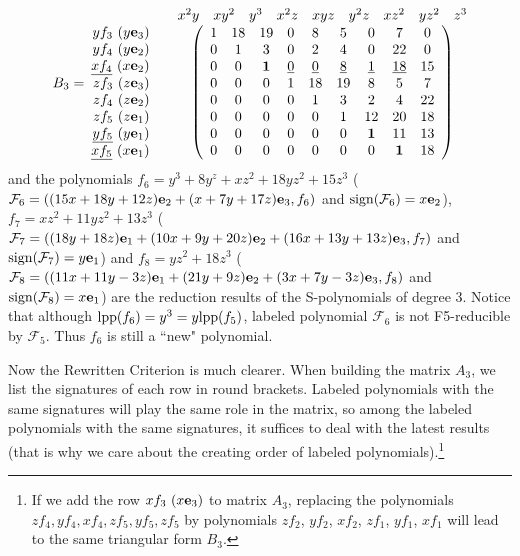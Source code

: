 \documentclass[preprint,authoryear,3p,12pt]{elsarticle}
\def\lpp{{\rm lpp}}
\def\eb{{\bf e}}
\def\s{{\rm{sign}}}
\begin{document}
\[
\begin{array}{cc} & \begin{array}{cccccccccc}
x^2y & xy^2 & y^3 & x^2z & xyz & y^2z & xz^2 & yz^2 & z^3
\end{array}\\
\begin{array}{r}
yf_3\ (y\eb_3)\\ yf_4\ (y\eb_2)\\ \underline{xf_4}\ (x\eb_2)\\
B_3=\ zf_3\ (z\eb_3)\\ zf_4\ (z\eb_2)\\ zf_5\ (z\eb_1)
\\ \underline{yf_5}\ (y\eb_1)\\ \underline{xf_5}\ (x\eb_1)
\end{array} &
\left(
\begin{array}{cccccccccc}
1 & 18 & 19 & 0 & {8} & 5 & 0 & 7 & 0\\
0 & 1 & 3 & 0 & {2} & 4 & 0 & 22 & 0\\
0 & 0 & \textbf{1} & \underline{0} & \underline{0} & \underline{8} & \underline{1} & \underline{18} & 15\\
0 & 0 & 0 & 1 & 18 & 19 & 8 & 5 & 7\\
0 & 0 & 0 & 0 & 1 & 3 & 2 & 4 & 22\\
0 & 0 & 0 & 0 & 0 & 1 & 12 & 20 & 18\\
0 & 0 & 0 & 0 & 0 & 0 & \textbf{1} & 11 & 13\\
0 & 0 & 0 & 0 & 0 & 0 & 0 & \textbf{1} & 18
\end{array} \right)
\end{array}
\]
and the polynomials $f_6=y^3+8y^z+xz^2+18yz^2+15z^3$ (${\mathcal
F}_6=((15x+18y+12z)\eb_2+(x+7y+17z)\eb_3, f_6)$ and $\s({\mathcal
F}_6)=x\eb_2$), $f_7=xz^2+11yz^2+13z^3$ (${\mathcal
F}_7=((18y+18z)\eb_1+(10x+9y+20z)\eb_2+(16x+13y+13z)\eb_3, f_7)$ and
$\s({\mathcal F}_7)=y\eb_1$) and $f_8=yz^2+18z^3$ (${\mathcal
F}_8=((11x+11y-3z)\eb_1+(21y+9z)\eb_2+(3x+7y-3z)\eb_3, f_8)$ and
$\s({\mathcal F}_8)=x\eb_1$) are the reduction results of the
S-polynomials of degree 3. Notice that although
$\lpp(f_6)=y^3=y\lpp(f_5)$, labeled polynomial ${\mathcal F}_6$ is
not F5-reducible by ${\mathcal F}_5$. Thus $f_6$ is still a ``new"
polynomial.

Now the Rewritten Criterion is much clearer. When building the
matrix $A_3$, we list the signatures of each row in round brackets.
Labeled polynomials with the same signatures will play the same role
in the matrix, so among the labeled polynomials with the same
signatures, it suffices to deal with the latest results (that is why
we care about the creating order of labeled
polynomials).\footnote{If we add the row $xf_3\ (x\eb_3)$ to matrix
$A_3$, replacing the polynomials $zf_4, yf_4, xf_4, zf_5, yf_5,
zf_5$ by polynomials $zf_2$, $yf_2$, $xf_2$, $zf_1$, $yf_1$, $xf_1$
will lead to the same triangular form $B_3$.}
\end{document}
